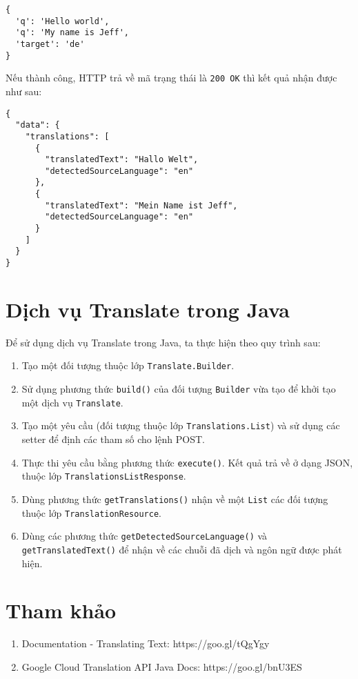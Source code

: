 \documentclass[../thesis.tex]{subfiles}
\begin{document}
\begin{lstlisting}[style=link]
{
  'q': 'Hello world',
  'q': 'My name is Jeff',
  'target': 'de'
}
\end{lstlisting}

Nếu thành công, HTTP trả về mã trạng thái là \lstinline{200 OK} thì kết quả nhận được như sau:

\begin{lstlisting}[style=link]
{
  "data": {
    "translations": [
      {
        "translatedText": "Hallo Welt",
        "detectedSourceLanguage": "en"
      },
      {
        "translatedText": "Mein Name ist Jeff",
        "detectedSourceLanguage": "en"
      }
    ]
  }
} 
\end{lstlisting}

\section{Dịch vụ Translate trong Java}
Để sử dụng dịch vụ Translate trong Java, ta thực hiện theo quy trình sau:
\begin{enumerate}
  \item Tạo một đối tượng thuộc lớp \lstinline{Translate.Builder}.
  \item Sử dụng phương thức \lstinline{build()} của đối tượng \lstinline{Builder} vừa tạo để khởi tạo một dịch vụ \lstinline{Translate}.
  \item Tạo một yêu cầu (đối tượng thuộc lớp \lstinline{Translations.List}) và sử dụng các setter để định các tham số cho lệnh POST.
  \item Thực thi yêu cầu bằng phương thức \lstinline{execute()}. Kết quả trả về ở dạng JSON, thuộc lớp \lstinline{TranslationsListResponse}.
  \item Dùng phương thức \lstinline{getTranslations()} nhận về một \lstinline{List} các đối tượng thuộc lớp \lstinline{TranslationResource}.
  \item Dùng các phương thức \lstinline{getDetectedSourceLanguage()} và \lstinline{getTranslatedText()} để nhận về các chuỗi đã dịch và ngôn ngữ được phát hiện.
\end{enumerate}

\section*{Tham khảo}

\begin{enumerate}
  \item Documentation - Translating Text: https://goo.gl/tQgYgy
  \item Google Cloud Translation API Java Docs: https://goo.gl/bnU3ES
\end{enumerate}
\end{document}
